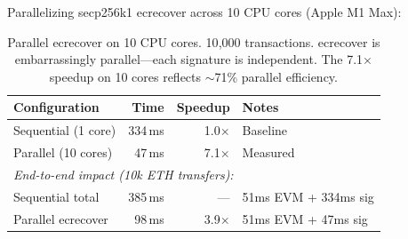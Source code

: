 Parallelizing secp256k1 ecrecover across 10 CPU cores (Apple M1 Max):

\begin{table}[h]
\centering
\small
\begin{tabular}{lrrl}
\toprule
\textbf{Configuration} & \textbf{Time} & \textbf{Speedup} & \textbf{Notes} \\
\midrule
Sequential (1 core)    & 334\,ms & 1.0$\times$  & Baseline \\
Parallel (10 cores)    & 47\,ms  & 7.1$\times$  & Measured \\
\midrule
\multicolumn{4}{l}{\textit{End-to-end impact (10k ETH transfers):}} \\
Sequential total       & 385\,ms & ---           & 51ms EVM + 334ms sig \\
Parallel ecrecover     & 98\,ms  & 3.9$\times$  & 51ms EVM + 47ms sig \\
\bottomrule
\end{tabular}
\caption{Parallel ecrecover on 10 CPU cores. 10{,}000 transactions.
ecrecover is embarrassingly parallel---each signature is independent.
The 7.1$\times$ speedup on 10 cores reflects $\sim$71\% parallel efficiency.}
\label{tab:ecrecover}
\end{table}

